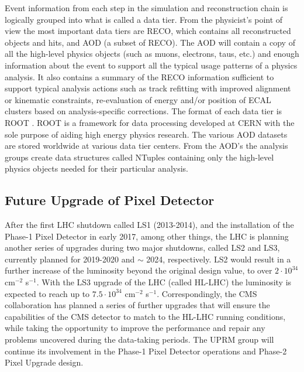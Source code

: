 Event information from each step in the simulation and reconstruction chain is logically grouped into what is called a data tier\cite{CMScomp1}. From the physicist's point of view the most important data tiers are RECO, which contains all reconstructed objects and hits, and AOD (a subset of RECO). The AOD will contain a copy of all the high-level physics objects (such as muons, electrons, taus, etc.) and enough information about the event to support all the typical usage patterns of a physics analysis. It also contains a summary of the RECO information sufficient to support typical analysis actions such as track refitting with improved alignment or kinematic constraints, re-evaluation of energy and/or position of ECAL clusters based on analysis-specific corrections. The format of each data tier is ROOT \cite{ROOT}. ROOT is a framework for data processing developed at CERN with the sole purpose of aiding high energy physics research. The various AOD datasets are stored worldwide at various data tier centers. From the AOD's the analysis groups create data structures called NTuples containing only the high-level physics objects needed for their particular analysis. 

\subsection{Future Upgrade of Pixel Detector}
After the first LHC shutdown called LS1 (2013-2014), and the installation of the Phase-1 Pixel Detector \cite{Phase1FPix} in early 2017, among other things, the LHC is planning another series of upgrades during two major shutdowns, called LS2 and LS3, currently planned for 2019-2020 and $\sim$ 2024, respectively. LS2 would result in a further increase of the luminosity beyond the original design value, to over $2\cdot{10}^{34}$ cm$^{-2}$ s$^{-1}$.  With the LS3 upgrade of the LHC (called HL-LHC\cite{HLLHC}) the luminosity is expected to reach up to $7.5\cdot{10}^{34}$ cm$^{-2}$ s$^{-1}$. Correspondingly, the CMS collaboration has planned a series of further upgrades \cite{CMSPhase2,CMSupgrades} that will ensure the capabilities of the CMS detector to match to the HL-LHC running conditions, while taking the opportunity to improve the performance and repair any problems uncovered during the data-taking periods. The UPRM group will continue its involvement in the Phase-1 Pixel Detector operations and Phase-2 Pixel Upgrade design.\\

